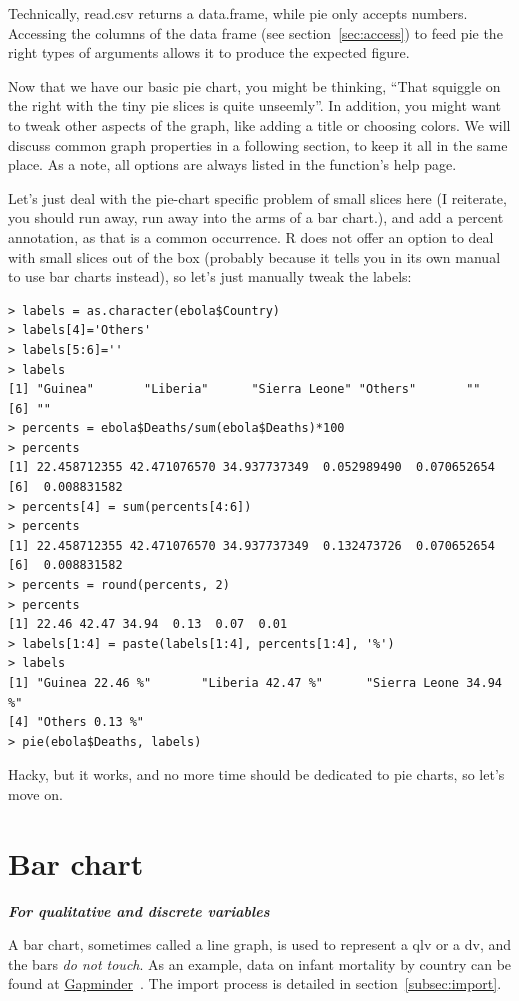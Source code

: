 \documentclass{report}
\newcommand{\code}[1]{\textsf{\ttfamily #1}}
\newcommand{\notefor}[1]{\hfill\textbf{\textit{#1}}}
\begin{document}
	Technically, \code{read.csv} returns a \code{data.frame}, while \code{pie} only accepts numbers. Accessing the columns of the data frame (see section~\ref{sec:access}) to feed \code{pie} the right types of arguments allows it to produce the expected figure.

	Now that we have our basic pie chart, you might be thinking, ``That squiggle on the right with the tiny pie slices is quite unseemly''. In addition, you might want to tweak other aspects of the graph, like adding a title or choosing colors. We will discuss common graph properties in a following section, to keep it all in the same place. As a note, all options are always listed in the function's help page.
		
	Let's just deal with the pie-chart specific problem of small slices here (I reiterate, you should run away, run away into the arms of a bar chart.), and add a percent annotation, as that is a common occurrence. R does not offer an option to deal with small slices out of the box (probably because it tells you in its own manual to use bar charts instead), so let's just manually tweak the labels:
	\begin{verbatim}
> labels = as.character(ebola$Country)
> labels[4]='Others'
> labels[5:6]=''
> labels
[1] "Guinea"       "Liberia"      "Sierra Leone" "Others"       ""            
[6] ""
> percents = ebola$Deaths/sum(ebola$Deaths)*100
> percents
[1] 22.458712355 42.471076570 34.937737349  0.052989490  0.070652654
[6]  0.008831582
> percents[4] = sum(percents[4:6])
> percents
[1] 22.458712355 42.471076570 34.937737349  0.132473726  0.070652654
[6]  0.008831582
> percents = round(percents, 2)
> percents
[1] 22.46 42.47 34.94  0.13  0.07  0.01
> labels[1:4] = paste(labels[1:4], percents[1:4], '%')
> labels
[1] "Guinea 22.46 %"       "Liberia 42.47 %"      "Sierra Leone 34.94 %"
[4] "Others 0.13 %"
> pie(ebola$Deaths, labels)
	\end{verbatim}
	Hacky, but it works, and no more time should be dedicated to pie charts, so let's move on.

	\section{Bar chart}\label{sec:barchart}
	\notefor{For qualitative and discrete variables}
		
	A bar chart, sometimes called a line graph, is used to represent a \gls{qlv} or a \gls{dv}, and the bars \emph{do not touch}. As an example, data on infant mortality by country can be found at \href{https://docs.google.com/spreadsheets/d/1OHMMuHbSFKDolNHXsmgHYlkjSKfAZyyY1P-ddMu_Fz0/pub}{Gapminder}~\cite{gapminder}. The import process is detailed in section~\ref{subsec:import}.
\end{document}
